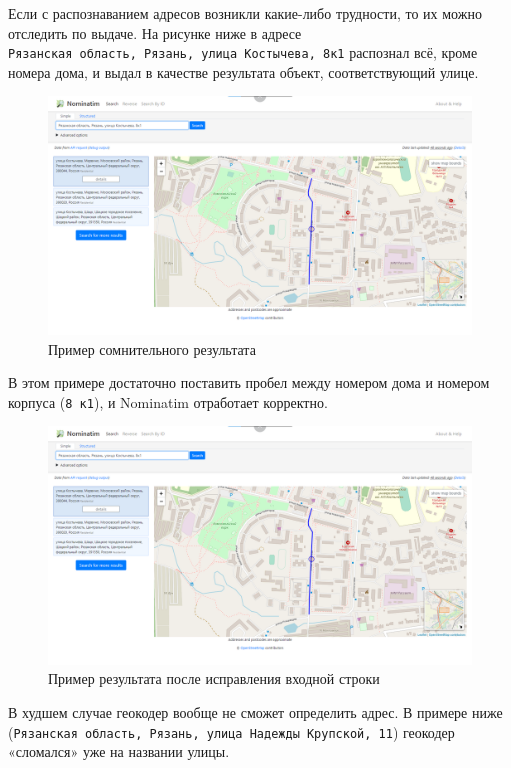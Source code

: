 \documentclass[
  12pt,
]{book}
\begin{document}
\begin{enumerate}
  Если с распознаванием адресов возникли какие-либо трудности, то их можно отследить по выдаче. На рисунке ниже в адресе \texttt{Рязанская\ область,\ Рязань,\ улица\ Костычева,\ 8к1} распознал всё, кроме номера дома, и выдал в качестве результата объект, соответствующий улице.

  \begin{figure}
  \centering
  \includegraphics{images/Ex08_Geocoding/Nominatim03.png}
  \caption{Пример сомнительного результата}
  \end{figure}

  В этом примере достаточно поставить пробел между номером дома и номером корпуса (\texttt{8\ к1}), и Nominatim отработает корректно.

  \begin{figure}
  \centering
  \includegraphics{images/Ex08_Geocoding/Nominatim03.png}
  \caption{Пример результата после исправления входной строки}
  \end{figure}

  В худшем случае геокодер вообще не сможет определить адрес. В примере ниже (\texttt{Рязанская\ область,\ Рязань,\ улица\ Надежды\ Крупской,\ 11}) геокодер «сломался» уже на названии улицы.


\end{enumerate}
\end{document}
